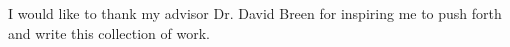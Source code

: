 \begin{dedications}
I would like to thank my advisor Dr. David Breen for inspiring me to push forth and write this collection of work.
\end{dedications}
